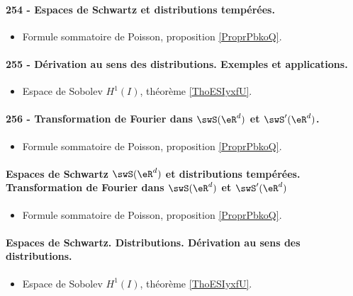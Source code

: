 \paragraph{254 - Espaces de Schwartz et distributions tempérées.}
\begin{itemize}
    \item Formule sommatoire de Poisson, proposition \ref{ProprPbkoQ}.
\end{itemize}
\paragraph{255 - Dérivation au sens des distributions. Exemples et applications.}
\begin{itemize}
    \item Espace de Sobolev \( H^1(I)\), théorème \ref{ThoESIyxfU}.
\end{itemize}
\paragraph{256 - Transformation de Fourier dans \( \swS(\eR^d)\) et \( \swS'(\eR^d)\).}
\begin{itemize}
    \item Formule sommatoire de Poisson, proposition \ref{ProprPbkoQ}.
\end{itemize}
\paragraph{Espaces de Schwartz \( \swS(\eR^d)\) et distributions tempérées. Transformation de Fourier dans \( \swS(\eR^d)\) et \( \swS'(\eR^d)\)}
\begin{itemize}
    \item Formule sommatoire de Poisson, proposition \ref{ProprPbkoQ}.
\end{itemize}
\paragraph{Espaces de Schwartz. Distributions. Dérivation au sens des distributions.}
\begin{itemize}
    \item Espace de Sobolev \( H^1(I)\), théorème \ref{ThoESIyxfU}.
\end{itemize}

